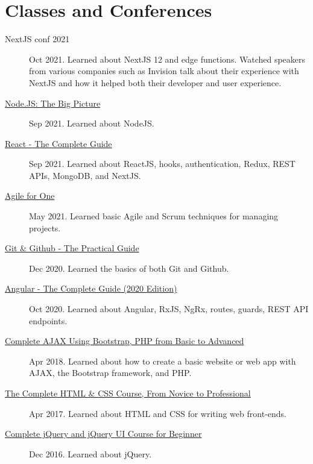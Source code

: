 \documentclass{article}
\begin{document}

\section{Classes and Conferences}

\begin{description}
  \item[NextJS conf 2021] Oct 2021. Learned about NextJS 12 and edge functions. Watched speakers from various companies such as Invision talk about their experience with NextJS and how it helped both their developer and user experience.
  \item[\href{https://sirkoik.github.io/CurriculumVitae/certifications/Nodejs-The-Big-Picture/certificate.pdf}{Node.JS: The Big Picture}] Sep 2021. Learned about NodeJS.
  \item[\href{https://www.udemy.com/certificate/UC-2196f0cf-2dce-4a11-9d8e-421827506ad1/}{React - The Complete Guide}] Sep 2021. Learned about ReactJS, hooks, authentication, Redux, REST APIs, MongoDB, and NextJS.
  \item[\href{https://sirkoik.github.io/CurriculumVitae/certifications/Agile-for-One/certificate.pdf}{Agile for One}] May 2021. Learned basic Agile and Scrum techniques for managing projects.
  \item[\href{https://sirkoik.github.io/CurriculumVitae/certifications/certificate-of-completion-for-git-github-the-practical-guide.pdf}{Git \& Github - The Practical Guide}] Dec 2020. Learned the basics of both Git and Github.
  \item[\href{https://www.udemy.com/certificate/UC-624f6f83-940e-428f-accd-d16113661ded}{Angular - The Complete Guide (2020 Edition)}] Oct 2020. Learned about Angular, RxJS, NgRx, routes, guards, REST API endpoints.
  \item[\href{https://www.udemy.com/certificate/UC-E3EMJE4O}{Complete AJAX Using Bootstrap, PHP from Basic to Advanced}] Apr 2018. Learned about how to create a basic website or web app with AJAX, the Bootstrap framework, and PHP.
  \item[\href{https://www.udemy.com/certificate/UC-QZDWYX3V}{The Complete HTML \& CSS Course, From Novice to Professional}] Apr 2017. Learned about HTML and CSS for writing web front-ends.
  \item[\href{https://www.udemy.com/certificate/UC-4V285L2N}{Complete jQuery and jQuery UI Course for Beginner}] Dec 2016. Learned about jQuery.
\end{description}
\end{document}
